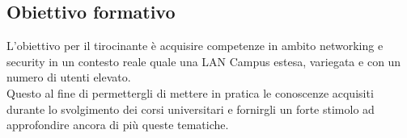 \documentclass[Tesi.tex]{subfiles}
\begin{document}
\subsection{Obiettivo formativo}
L'obiettivo per il tirocinante è acquisire competenze in ambito networking e security in un contesto reale quale una LAN Campus estesa, variegata e con un numero di utenti elevato. \\
Questo al fine di permettergli di mettere in pratica le conoscenze acquisiti durante lo svolgimento dei corsi universitari e fornirgli un forte stimolo ad approfondire ancora di più queste tematiche.
\end{document}
